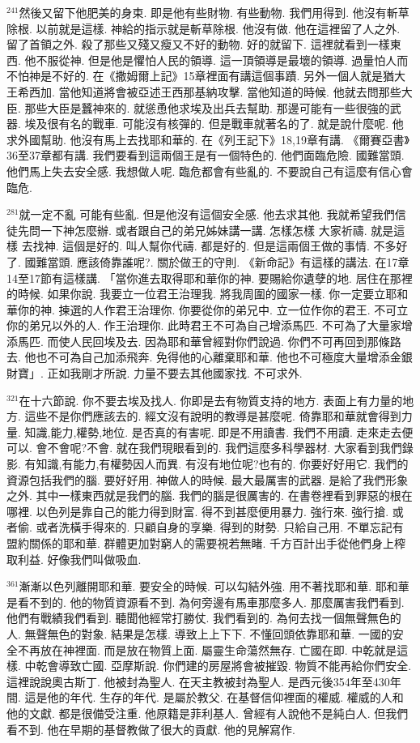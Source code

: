 \documentclass{book}
\begin{document}
$^{241}$然後又留下他肥美的身束.
即是他有些財物.
有些動物.
我們用得到.
他沒有斬草除根.
以前就是這樣.
神給的指示就是斬草除根.
他沒有做.
他在這裡留了人之外.
留了首領之外.
殺了那些又殘又瘦又不好的動物.
好的就留下.
這裡就看到一樣東西.
他不服從神.
但是他是懼怕人民的領導.
這一頂領導是最壞的領導.
過量怕人而不怕神是不好的.
在《撒姆爾上記》15章裡面有講這個事蹟.
另外一個人就是猶大王希西加.
當他知道將會被亞述王西那基納攻擊.
當他知道的時候.
他就去問那些大臣.
那些大臣是蠶神來的.
就慫恿他求埃及出兵去幫助.
那邊可能有一些很強的武器.
埃及很有名的戰車.
可能沒有核彈的.
但是戰車就著名的了.
就是說什麼呢.
他求外國幫助.
他沒有馬上去找耶和華的.
在《列王記下》18,19章有講.
《爾賽亞書》36至37章都有講.
我們要看到這兩個王是有一個特色的.
他們面臨危險.
國難當頭.
他們馬上失去安全感.
我想做人呢.
臨危都會有些亂的.
不要說自己有這麼有信心會臨危.

$^{281}$就一定不亂 可能有些亂.
但是他沒有這個安全感.
他去求其他.
我就希望我們信徒先問一下神怎麼辦.
或者跟自己的弟兄姊妹講一講.
怎樣怎樣 大家祈禱.
就是這樣 去找神.
這個是好的.
叫人幫你代禱.
都是好的.
但是這兩個王做的事情.
不多好了.
國難當頭.
應該倚靠誰呢?.
關於做王的守則.
《新命記》有這樣的講法.
在17章14至17節有這樣講.
「當你進去取得耶和華你的神.
要賜給你遺孽的地.
居住在那裡的時候.
如果你說.
我要立一位君王治理我.
將我周圍的國家一樣.
你一定要立耶和華你的神.
揀選的人作君王治理你.
你要從你的弟兄中.
立一位作你的君王.
不可立你的弟兄以外的人.
作王治理你.
此時君王不可為自己增添馬匹.
不可為了大量家增添馬匹.
而使人民回埃及去.
因為耶和華曾經對你們說過.
你們不可再回到那條路去.
他也不可為自己加添飛奔.
免得他的心離棄耶和華.
他也不可極度大量增添金銀財寶」.
正如我剛才所說.
力量不要去其他國家找.
不可求外.

$^{321}$在十六節說.
你不要去埃及找人.
你即是去有物質支持的地方.
表面上有力量的地方.
這些不是你們應該去的.
經文沒有說明的教導是甚麼呢.
倚靠耶和華就會得到力量.
知識,能力,權勢,地位.
是否真的有害呢.
即是不用讀書.
我們不用讀.
走來走去便可以.
會不會呢?不會.
就在我們現眼看到的.
我們這麼多科學器材.
大家看到我們錄影.
有知識,有能力,有權勢因人而異.
有沒有地位呢?也有的.
你要好好用它.
我們的資源包括我們的腦.
要好好用.
神做人的時候.
最大最厲害的武器.
是給了我們形象之外.
其中一樣東西就是我們的腦.
我們的腦是很厲害的.
在書卷裡看到罪惡的根在哪裡.
以色列是靠自己的能力得到財富.
得不到甚麼便用暴力.
強行來.
強行搶.
或者偷.
或者洗橫手得來的.
只顧自身的享樂.
得到的財勢.
只給自己用.
不單忘記有盟約關係的耶和華.
群體更加對窮人的需要視若無睹.
千方百計出手從他們身上榨取利益.
好像我們叫做吸血.

$^{361}$漸漸以色列離開耶和華.
要安全的時候.
可以勾結外強.
用不著找耶和華.
耶和華是看不到的.
他的物質資源看不到.
為何旁邊有馬車那麼多人.
那麼厲害我們看到.
他們有戰績我們看到.
聽聞他經常打勝仗.
我們看到的.
為何去找一個無聲無色的人.
無聲無色的對象.
結果是怎樣.
導致上上下下.
不懂回頭依靠耶和華.
一國的安全不再放在神裡面.
而是放在物質上面.
屬靈生命蕩然無存.
亡國在即.
中乾就是這樣.
中乾會導致亡國.
亞摩斯說.
你們建的房屋將會被摧毀.
物質不能再給你們安全.
這裡說說奧古斯丁.
他被封為聖人.
在天主教被封為聖人.
是西元後354年至430年間.
這是他的年代.
生存的年代.
是屬於教父.
在基督信仰裡面的權威.
權威的人和他的文獻.
都是很備受注重.
他原籍是菲利基人.
曾經有人說他不是純白人.
但我們看不到.
他在早期的基督教做了很大的貢獻.
他的見解寫作.
\end{document}
